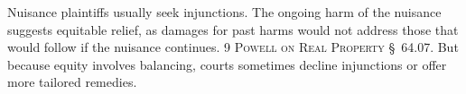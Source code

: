 Nuisance plaintiffs usually seek injunctions. The ongoing harm of the nuisance
suggests equitable relief, as damages for past harms would not address those
that would follow if the nuisance continues. 9 \textsc{Powell on Real
Property} \S~64.07. But because equity involves balancing, courts sometimes
decline injunctions or offer more tailored remedies. 

